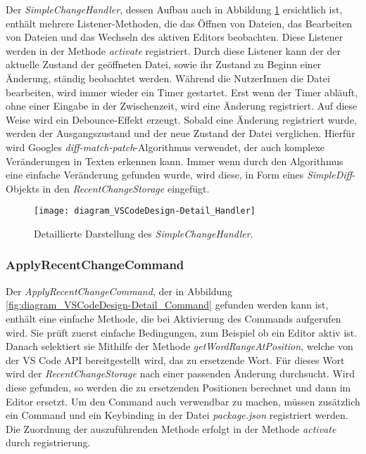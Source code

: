 Der \emph{SimpleChangeHandler}, 
dessen Aufbau auch in Abbildung \ref{fig:diagram_VSCodeDesign-Detail_Handler} ersichtlich ist,
enthält mehrere Listener-Methoden,
die das Öffnen von Dateien, das Bearbeiten von Dateien und das
Wechseln des aktiven Editors beobachten. Diese Listener werden
in der Methode \emph{activate} registriert. Durch diese Listener
kann der der aktuelle Zustand der geöffneten Datei, sowie ihr Zustand
zu Beginn einer Änderung, ständig beobachtet werden. Während
die NutzerInnen die Datei bearbeiten, wird immer wieder ein
Timer gestartet. Erst wenn der Timer abläuft, ohne einer Eingabe
in der Zwischenzeit, wird eine Änderung registriert. Auf diese 
Weise wird ein Debounce-Effekt erzeugt. Sobald eine Änderung
registriert wurde, werden der Ausgangszustand und der neue Zustand
der Datei verglichen. Hierfür wird Googles 
\emph{diff-match-patch}-Algorithmus \cite{DiffMatchPatchGithub}
verwendet, der auch komplexe Veränderungen in Texten erkennen kann. 
Immer wenn durch den Algorithmus eine einfache Veränderung gefunden
wurde, wird diese, in Form eines \emph{SimpleDiff}-Objekts in
den \emph{RecentChangeStorage} eingefügt.

\begin{figure}
    \centering
    \texttt{[image: diagram\_VSCodeDesign-Detail\_Handler]}
    \caption{Detaillierte Darstellung des \emph{SimpleChangeHandler}.}
    \label{fig:diagram_VSCodeDesign-Detail_Handler}
\end{figure}

\subsubsection{ApplyRecentChangeCommand}

Der \emph{ApplyRecentChangeCommand}, 
der in Abbildung \ref{fig:diagram_VSCodeDesign-Detail_Command} gefunden werden kann ist,
enthält eine einfache Methode,
die bei Aktivierung des Commands aufgerufen wird. Sie prüft zuerst
einfache Bedingungen, zum Beispiel ob ein Editor aktiv ist.
Danach selektiert sie Mithilfe der Methode \emph{getWordRangeAtPosition},
welche von der VS Code API bereitgestellt wird, das zu ersetzende Wort.
Für dieses Wort wird der \emph{RecentChangeStorage} nach einer passenden
Änderung durchsucht. Wird diese gefunden, so werden die zu ersetzenden
Positionen berechnet und dann im Editor ersetzt. Um den Command auch 
verwendbar zu machen, müssen zusätzlich ein Command und ein Keybinding
in der Datei \emph{package.json} registriert werden. Die Zuordnung
der auszuführenden Methode erfolgt in der Methode \emph{activate}
durch registrierung.


